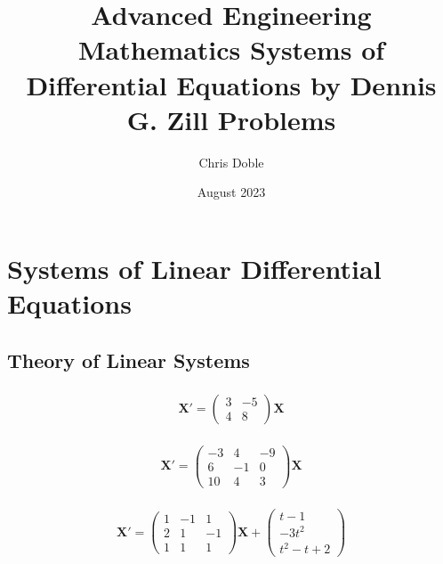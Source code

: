 \documentclass{article}
\title{Advanced Engineering Mathematics Systems of Differential Equations by Dennis G. Zill Problems}
\author{Chris Doble}
\date{August 2023}
\begin{document}
\maketitle

\tableofcontents

\setcounter{section}{9}
\section{Systems of Linear Differential Equations}

\subsection{Theory of Linear Systems}

\subsubsection{}

\[\mathbf{X}' = \begin{pmatrix}
    3 & -5 \\
    4 & 8
  \end{pmatrix} \mathbf{X}\]

\setcounter{subsubsection}{2}
\subsubsection{}

\[\mathbf{X}' = \begin{pmatrix}
    -3 & 4  & -9 \\
    6  & -1 & 0  \\
    10 & 4  & 3
  \end{pmatrix} \mathbf{X}\]

\setcounter{subsubsection}{4}
\subsubsection{}

\[\mathbf{X}' = \begin{pmatrix}
    1 & -1 & 1  \\
    2 & 1  & -1 \\
    1 & 1  & 1
  \end{pmatrix} \mathbf{X} + \begin{pmatrix}
    t - 1  \\
    -3 t^2 \\
    t^2 - t + 2
  \end{pmatrix}\]
\end{document}
